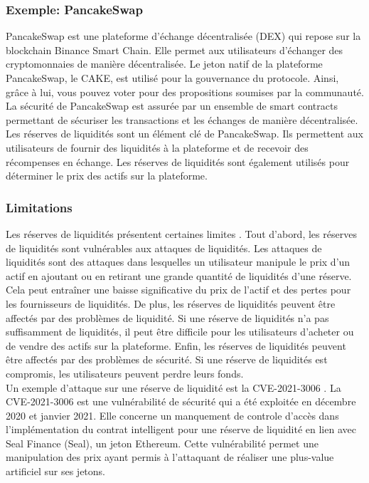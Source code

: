 \subsubsection{Exemple: PancakeSwap}
PancakeSwap est une plateforme d’échange décentralisée (DEX) qui repose sur la blockchain Binance Smart Chain. \cite{augustin2022yield} Elle permet aux utilisateurs d’échanger des 
cryptomonnaies de manière décentralisée. Le jeton natif de la plateforme PancakeSwap, le CAKE, est utilisé 
pour la gouvernance du protocole. Ainsi, grâce à lui, vous pouvez voter pour des propositions soumises par la communauté. La sécurité de PancakeSwap est assurée 
par un ensemble de smart contracts permettant de sécuriser les transactions et les échanges de manière décentralisée. Les réserves de liquidités sont un 
élément clé de PancakeSwap. Ils permettent aux utilisateurs de fournir des liquidités à la plateforme et de recevoir des récompenses en échange. Les réserves 
de liquidités sont également utilisés pour déterminer le prix des actifs sur la plateforme.

\subsubsection{Limitations}
Les réserves de liquidités présentent certaines limites \cite{caldarelli2021blockchain}. Tout d’abord, les réserves de liquidités sont vulnérables aux attaques de liquidités. Les attaques 
de liquidités sont des attaques dans lesquelles un utilisateur manipule le prix d’un actif en ajoutant ou en retirant une grande quantité de liquidités d’une 
réserve. Cela peut entraîner une baisse significative du prix de l’actif et des pertes pour les fournisseurs de liquidités. De plus, les réserves de liquidités 
peuvent être affectés par des problèmes de liquidité. Si une réserve de liquidités n’a pas suffisamment de liquidités, il peut être difficile pour les 
utilisateurs d’acheter ou de vendre des actifs sur la plateforme. Enfin, les réserves de liquidités peuvent être affectés par des problèmes de sécurité. Si 
une réserve de liquidités est compromis, les utilisateurs peuvent perdre leurs fonds. \\
Un exemple d'attaque sur une réserve de liquidité est la CVE-2021-3006 \cite{nvd2021-3006,blocksec2021Seal}. La CVE-2021-3006 est une vulnérabilité de sécurité qui a été exploitée en décembre 
2020 et janvier 2021. Elle concerne un manquement de controle d'accès dans l’implémentation du contrat intelligent pour une réserve de liquidité en lien avec 
Seal Finance (Seal), un jeton Ethereum. Cette vulnérabilité permet une manipulation des prix ayant permis à l'attaquant de réaliser une plus-value artificiel 
sur ses jetons.
